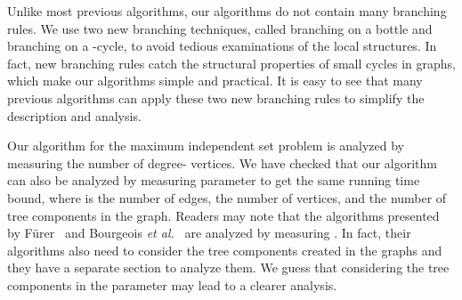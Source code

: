 \documentclass[runningheads]{llncs}
\begin{document}
Unlike most previous algorithms, our algorithms do not contain
many branching rules. We use two new branching techniques, called
branching on a bottle and branching on a -cycle, to avoid
tedious examinations of the local structures. In fact, new
branching rules catch the structural properties of small cycles in
graphs, which make our algorithms simple and practical. It is easy
to see that many previous algorithms can apply these two new
branching rules to simplify the description and analysis.

Our algorithm for the maximum independent set problem is analyzed
by measuring the number of degree- vertices. We have checked
that our algorithm  can also be analyzed by measuring
parameter  to get the same running time bound, where  is
the number of edges,  the number of vertices, and  the
number of tree components in the graph. Readers may note that the
algorithms presented by F{\"u}rer~\cite{Furer:ISsparse} and
Bourgeois \emph{et al.}~\cite{Bourgeois:3IS} are analyzed by
measuring . In fact, their algorithms also need to consider
the tree components created in the graphs and they have a separate
section to analyze them. We guess that considering the tree
components in the parameter may lead to a clearer analysis.
\end{document}
